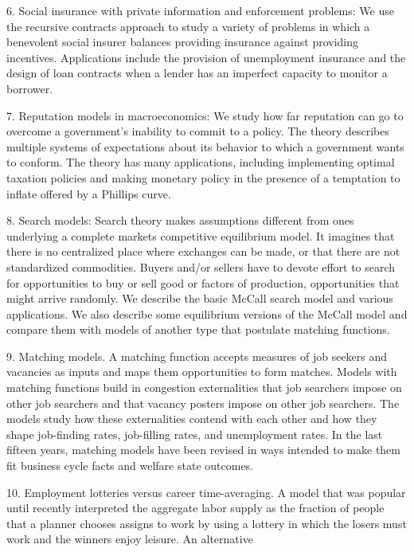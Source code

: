 \medskip
\item{6.}  Social insurance with private information and
enforcement problems: We use the recursive contracts approach to
study a variety of problems in which a benevolent social insurer
 balances providing insurance against
providing incentives.  Applications
include the provision of unemployment insurance
and the design of loan contracts when a lender
has an imperfect capacity to monitor a borrower.
\medskip
\item{7.}   Reputation  models in macroeconomics:   We study
how far reputation can go to overcome a government's
inability to  commit to a policy.   The theory describes
multiple systems of expectations about its behavior
to which a government wants to conform.  The theory
has many applications, including implementing optimal
taxation policies and  making monetary
policy in the presence of a temptation to inflate
offered by a Phillips curve.
\medskip
\item{8.}  Search models: Search theory
makes  assumptions
different from   ones underlying a complete markets competitive
equilibrium model.  It imagines that  there is no
centralized  place where exchanges can be made,
or that there are not standardized commodities.  Buyers
and/or sellers have to devote effort to search
for opportunities to buy or sell good or factors of production, opportunities that might 
arrive randomly. We describe the basic
McCall search model and various applications.
We also describe some equilibrium versions of the McCall model
and compare
them with  models of another  type that postulate
matching functions.
\medskip
\item {9.} Matching models.  A matching function
accepts measures of  job seekers and vacancies as inputs and maps them
 opportunities to  form matches.  Models with matching functions
build in congestion externalities that job searchers impose on  other job searchers
and that vacancy posters impose on other job searchers.  The models study how these externalities contend with each other
 and how they shape job-finding rates, job-filling rates, and unemployment rates.
In the last fifteen years, matching models have been revised in ways intended to make them
fit business cycle facts and welfare state outcomes.
\medskip
\item{10.} Employment lotteries versus career time-averaging.  A model that was popular until recently interpreted
 the aggregate labor supply
as the fraction of people that a planner chooses assigns to work by using  a lottery
in which the losers must work and the winners enjoy leisure.  An  alternative
